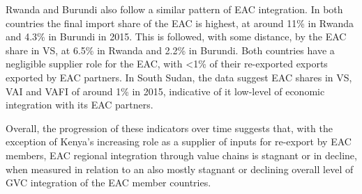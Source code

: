 \documentclass[a4paper]{article}
\begin{document}
 Rwanda and Burundi also follow a similar pattern of EAC integration. In both countries the final import share of the EAC is highest, at around 11\% in Rwanda and 4.3\% in Burundi in 2015. This is followed, with some distance, by the EAC share in VS, at 6.5\% in Rwanda and 2.2\% in Burundi. Both countries have a negligible supplier role for the EAC, with <1\% of their re-exported exports exported by EAC partners. In South Sudan, the data suggest EAC shares in VS, VAI and VAFI of around 1\% in 2015, indicative of it low-level of economic integration with its EAC partners. \newline 
 
 Overall, the progression of these indicators over time suggests that, with the exception of Kenya's increasing role as a supplier of inputs for re-export by EAC members, EAC regional integration through value chains is stagnant or in decline, when measured in relation to an also mostly stagnant or declining overall level of GVC integration of the EAC member countries. 




\end{document}
